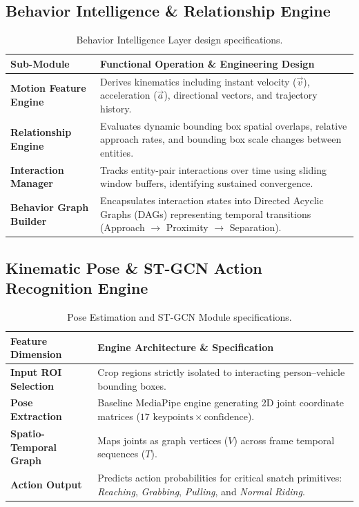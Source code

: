 \documentclass[11pt, a4paper]{article}
\begin{document}
\subsection{Behavior Intelligence \& Relationship Engine}
\begin{table}[H]
\centering
\small
\renewcommand{\arraystretch}{1.3}
\begin{tabularx}{\textwidth}{|>{\hsize=0.3\hsize\bfseries}X|>{\hsize=0.7\hsize}X|}
\hline
\textbf{Sub-Module} & \textbf{Functional Operation \& Engineering Design} \\
\hline
Motion Feature Engine & Derives kinematics including instant velocity ($\vec{v}$), acceleration ($\vec{a}$), directional vectors, and trajectory history. \\
\hline
Relationship Engine & Evaluates dynamic bounding box spatial overlaps, relative approach rates, and bounding box scale changes between entities. \\
\hline
Interaction Manager & Tracks entity-pair interactions over time using sliding window buffers, identifying sustained convergence. \\
\hline
Behavior Graph Builder & Encapsulates interaction states into Directed Acyclic Graphs (DAGs) representing temporal transitions (Approach $\rightarrow$ Proximity $\rightarrow$ Separation). \\
\hline
\end{tabularx}
\caption{Behavior Intelligence Layer design specifications.}
\end{table}

\subsection{Kinematic Pose \& ST-GCN Action Recognition Engine}
\begin{table}[H]
\centering
\small
\renewcommand{\arraystretch}{1.3}
\begin{tabularx}{\textwidth}{|>{\hsize=0.3\hsize\bfseries}X|>{\hsize=0.7\hsize}X|}
\hline
\textbf{Feature Dimension} & \textbf{Engine Architecture \& Specification} \\
\hline
Input ROI Selection & Crop regions strictly isolated to interacting person--vehicle bounding boxes. \\
\hline
Pose Extraction & Baseline MediaPipe engine generating 2D joint coordinate matrices ($17 \text{ keypoints} \times \text{confidence}$). \\
\hline
Spatio-Temporal Graph & Maps joints as graph vertices ($V$) across frame temporal sequences ($T$). \\
\hline
Action Output & Predicts action probabilities for critical snatch primitives: \textit{Reaching}, \textit{Grabbing}, \textit{Pulling}, and \textit{Normal Riding}. \\
\hline
\end{tabularx}
\caption{Pose Estimation and ST-GCN Module specifications.}
\end{table}
\end{document}
